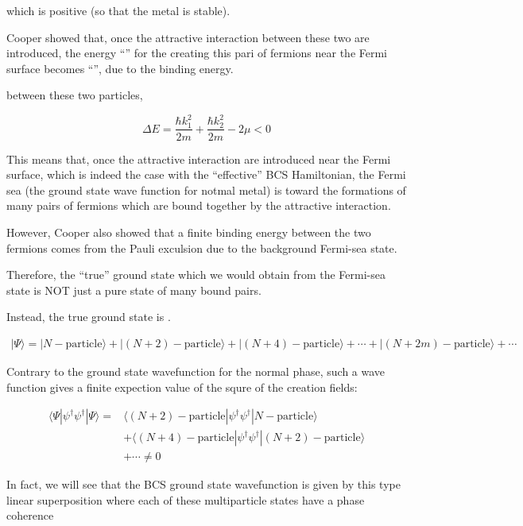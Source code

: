 ﻿\documentclass[twoside]{book}
\numberwithin{equation}{section}
\begin{document}
which is positive (so that the metal is stable). 

Cooper showed that, once the {} attractive interaction between these two are introduced, the energy ``'' for the creating this pari of fermions near the Fermi surface becomes ``'', due to the binding energy. 

between these two particles, 

\[\Delta E = \frac{\hbar k_1^2}{2m} + \frac{\hbar k_2^2}{2m}-2\mu < 0 \]

This means that, once the attractive interaction are introduced near the Fermi surface, which is indeed the case with the ``effective'' BCS Hamiltonian, the Fermi sea (the ground state wave function for notmal metal) is  toward the formations of many pairs of fermions which are bound together by the attractive interaction. 

However, Cooper also showed that a finite binding energy between the two fermions comes from the Pauli exculsion due to the background Fermi-sea state. 

Therefore, the ``true'' ground state which we would obtain from the Fermi-sea state is NOT just a pure state of many bound pairs. 

Instead, the true ground state is . 

\begin{align}\tag{A} \label{eqA}
|\Psi\rangle = |N-\text{particle}\rangle + |(N+2)-\text{particle}\rangle + |(N+4)-\text{particle}\rangle + \cdots + |(N+2m)-\text{particle}\rangle + \cdots \end{align}

Contrary to the ground state wavefunction for the normal phase, such a wave function gives a finite expection value of the squre of the creation fields: 

\[\begin{split}
\langle \Psi|\psi^{\dagger}\psi^{\dagger}|\Psi\rangle =& \langle (N+2)-\text{particle}|\psi^{\dagger}\psi^{\dagger}|N-\text{particle}\rangle \\ &+ \langle(N+4)-\text{particle}|\psi^{\dagger}\psi^{\dagger}|(N+2)-\text{particle}\rangle\\ & + \cdots \neq 0 \end{split}\]

In fact, we will see that the BCS ground state wavefunction is given by this type linear superposition where each of these multiparticle states have a phase coherence
\end{document}
